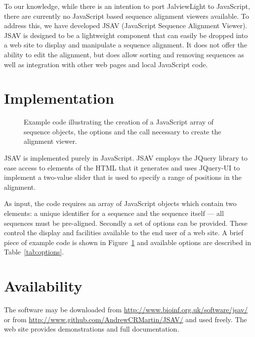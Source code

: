 \documentclass[a4]{bioinfo}
\begin{document}
To our knowledge, while there is an intention to port JalviewLight to
JavaScript, there are currently no JavaScript based sequence alignment
viewers available. To address this, we have developed JSAV (JavaScript
Sequence Alignment Viewer). JSAV is designed to be a lightweight
component that can easily be dropped into a web site to display and
manipulate a sequence alignment. It does not offer the ability to edit
the alignment, but does allow sorting and removing sequences as well
as integration with other web pages and local JavaScript code.



\section{Implementation}

\begin{figure}
\caption{\label{fig:code}Example code illustrating the creation of a
JavaScript array of sequence objects, the options and the call
necessary to create the alignment viewer.}
\end{figure}

JSAV is implemented purely in JavaScript. JSAV employs the JQuery
library to ease access to elements of the HTML that it generates and
uses JQuery-UI to implement a two-value slider that is used to specify
a range of positions in the alignment.

As input, the code requires an array of JavaScript objects which
contain two elements: a unique identifier for a sequence and the
sequence itself --- all sequences must be pre-aligned.  Secondly a set
of options can be provided. These control the display and facilities
available to the end user of a web site.  A brief piece of example
code is shown in Figure~\ref{fig:code} and available options are
described in Table~\ref{tab:options}.

\section{Availability}
The software may be downloaded from
\url{http://www.bioinf.org.uk/software/jsav/} or from
\url{http://www.github.com/AndrewCRMartin/JSAV/} and used freely. The
web site provides demonstrations and full documentation. 
\end{document}
